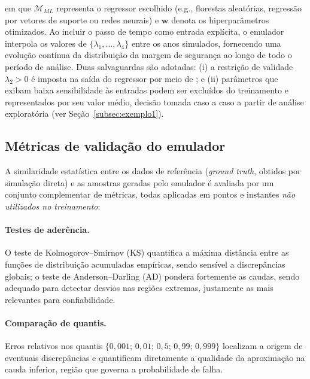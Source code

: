 \noindent em que $\mathcal{M}_{ML}$ representa o regressor escolhido (e.g., florestas aleatórias, regressão por vetores de suporte ou redes neurais) e $\mathbf{w}$ denota os hiperparâmetros otimizados. Ao incluir o passo de tempo como entrada explícita, o emulador interpola os valores de $\{\lambda_1, \dots, \lambda_4\}$ entre os anos simulados, fornecendo uma evolução contínua da distribuição da margem de segurança ao longo de todo o período de análise. Duas salvaguardas são adotadas: (i) a restrição de validade $\lambda_2 > 0$ é imposta na saída do regressor por meio de ; e (ii) parâmetros que exibam baixa sensibilidade às entradas podem ser excluídos do treinamento e representados por seu valor médio, decisão tomada caso a caso a partir de análise exploratória (ver Seção~\ref{subsec:exemplo1}).

\subsection{Métricas de validação do emulador}
\label{subsec:metricas}

A similaridade estatística entre os dados de referência (\textit{ground truth}, obtidos por simulação direta) e as amostras geradas pelo emulador é avaliada por um conjunto complementar de métricas, todas aplicadas em pontos e instantes \textit{não utilizados no treinamento}:

\paragraph{Testes de aderência.} O teste de Kolmogorov--Smirnov (KS) \citep{massey1951} quantifica a máxima distância entre as funções de distribuição acumuladas empíricas, sendo sensível a discrepâncias globais; o teste de Anderson--Darling (AD) \citep{anderson1952, scholz1987} pondera fortemente as caudas, sendo adequado para detectar desvios nas regiões extremas, justamente as mais relevantes para confiabilidade.

\paragraph{Comparação de quantis.} Erros relativos nos quantis $\{0{,}001;\, 0{,}01;\, 0{,}5;\, 0{,}99;\, 0{,}999\}$ localizam a origem de eventuais discrepâncias e quantificam diretamente a qualidade da aproximação na cauda inferior, região que governa a probabilidade de falha.

